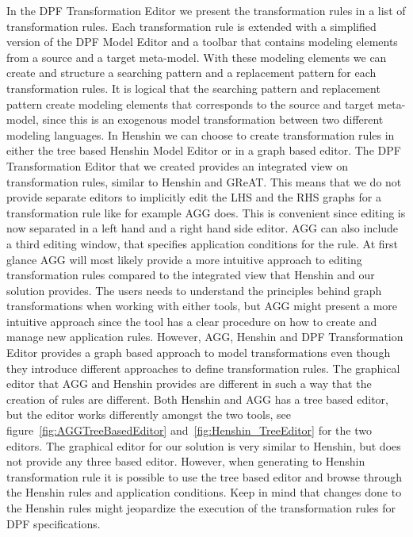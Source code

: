 In the DPF Transformation Editor we present the transformation rules in a list of
transformation rules. Each transformation rule is extended with a simplified
version of the DPF Model Editor and a toolbar that contains modeling elements
from a source and a target meta-model. With these modeling elements we can
create and structure a searching pattern and a replacement pattern for each
transformation rules. It is logical that the searching pattern and replacement
pattern create modeling elements that corresponds to the source and target
meta-model, since this is an exogenous model transformation between two
different modeling languages. In Henshin we can choose to create transformation
rules in either the tree based Henshin Model Editor or in a graph based editor.
The DPF Transformation Editor that we created provides an integrated view on
transformation rules, similar to Henshin and GReAT. This means that
we do not provide separate editors to implicitly edit the LHS and the RHS
graphs for a transformation rule like for example AGG does. This is convenient
since editing is now separated in a left hand and a right hand side editor. AGG
can also include a third editing window, that specifies application conditions
for the rule. At first glance AGG will most likely provide a more intuitive
approach to editing transformation rules compared to the integrated view that
Henshin and our solution provides. The users needs to understand the principles
behind graph transformations when working with either tools, but AGG might
present a more intuitive approach since the tool has a clear procedure on how
to create and manage new application rules. However, AGG, Henshin and DPF
Transformation Editor provides a graph based approach to model transformations
even though they introduce different approaches to define transformation rules.
The graphical editor that AGG and Henshin provides are different in such a way
that the creation of rules are different. Both Henshin and AGG has a tree based
editor, but the editor works differently amongst the two tools, see
figure~\ref{fig:AGGTreeBasedEditor} and~\ref{fig:Henshin_TreeEditor} for the
two editors. The graphical editor for our solution is very similar to Henshin,
but does not provide any three based editor. However, when generating to
Henshin transformation rule it is possible to use the tree based editor and
browse through the Henshin rules and application conditions. Keep in mind that
changes done to the Henshin rules might jeopardize the execution of the
transformation rules for DPF specifications.

